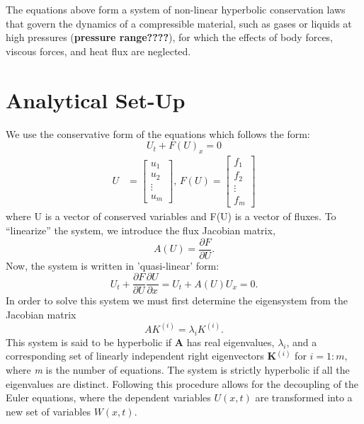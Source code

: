 \documentclass[]{article}
\begin{document}
	The equations above form a system of non-linear hyperbolic conservation laws that govern the dynamics of a compressible material, such as gases or liquids at high pressures (\textbf{pressure range????}), for which the effects of body forces, viscous forces, and heat flux are neglected. 
	
\section{Analytical Set-Up}
	We use the conservative form of the equations which follows the form:
	\begin{equation}
		U_t + F(U)_x = 0
		\label{Gen_Hyp}
	\end{equation}
		\begin{align}
			U &= \begin{bmatrix}
				u_{1} \\
				u_{2} \\
				\vdots \\
				u_{m}
				\end{bmatrix} \mbox{,  } 
				F(U) = \begin{bmatrix}
				f_{1} \\
				f_{2} \\
				\vdots \\
				f_{m}
				\end{bmatrix} 
		\end{align}
	where U is a vector of conserved variables and F(U) is a vector of fluxes. To ``linearize'' the system, we introduce the flux Jacobian matrix,
	\begin{equation}
		A(U) = \frac{\partial F}{\partial U}.
		\label{HypSys}
	\end{equation}
	Now, the system is written in 'quasi-linear' form:
	\begin{equation}
		U_t + \frac{\partial F}{\partial U}\frac{\partial U}{\partial x} = U_t + A(U) U_x = 0.
		\label{QLHypSys}
	\end{equation}	
	In order to solve this system we must first determine the eigensystem from the Jacobian matrix
	\begin{equation}
		A K^{(i)} = \lambda_i K^{(i)}.
	\end{equation}
	This system is said to be hyperbolic if \textbf{A} has real eigenvalues, $\lambda_i$, and a corresponding set of linearly independent right eigenvectors \textbf{K$^{(i)}$} for $i=1:m$, where \textit{m} is the number of equations. The system is strictly hyperbolic if all the eigenvalues are distinct. Following this procedure allows for the decoupling of the Euler equations, where the dependent variables $ U(x,t) $ are transformed into a new set of variables $ W(x,t) $. 
	
\end{document}
